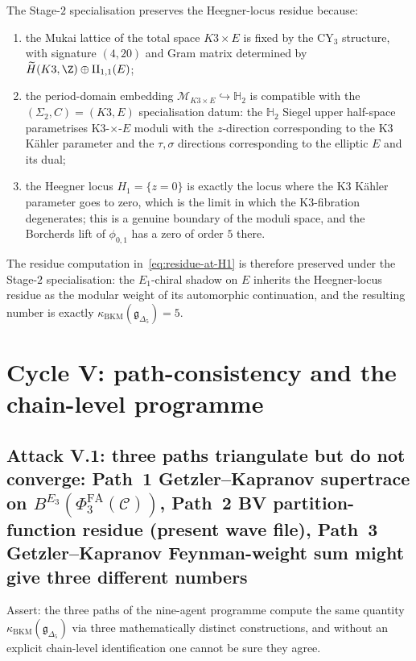 The Stage-$2$ specialisation preserves the Heegner-locus residue
because:
\begin{enumerate}[label=\textup{(\alph*)}]
\item the Mukai lattice of the total space $K3 \times E$ is fixed by
the CY$_3$ structure, with signature $(4, 20)$ and Gram matrix
determined by $\widetilde H(K3, \Z) \oplus \mathrm{II}_{1,1}(E)$;
\item the period-domain embedding $\mathcal{M}_{K3 \times E}
\hookrightarrow \mathbb{H}_2$ is compatible with the $(\Sigma_2, C) =
(K3, E)$ specialisation datum: the $\mathbb{H}_2$ Siegel upper
half-space parametrises K3-$\times$-$E$ moduli with the $z$-direction
corresponding to the K3 Kähler parameter and the $\tau, \sigma$
directions corresponding to the elliptic $E$ and its dual;
\item the Heegner locus $H_1 = \{z=0\}$ is exactly the locus where the
K3 Kähler parameter goes to zero, which is the limit in which the
K3-fibration degenerates; this is a genuine boundary of the moduli
space, and the Borcherds lift of $\phi_{0,1}$ has a zero of order
$5$ there.
\end{enumerate}
The residue computation in~\eqref{eq:residue-at-H1} is therefore
preserved under the Stage-$2$ specialisation: the $E_1$-chiral shadow
on $E$ inherits the Heegner-locus residue as the modular weight of
its automorphic continuation, and the resulting number is exactly
$\kappa_{\mathrm{BKM}}(\mathfrak{g}_{\Delta_5}) = 5$.

\section*{Cycle V: path-consistency and the chain-level programme}
\label{sec:BL-4-cycle-5}

\subsection*{Attack V.1: three paths triangulate but do not converge:
Path~1 Getzler--Kapranov supertrace on
$B^{E_3}(\Phi^{\mathrm{FA}}_3(\mathcal{C}))$, Path~2 BV
partition-function residue (present wave file), Path~3
Getzler--Kapranov Feynman-weight sum might give three different numbers}

Assert: the three paths of the nine-agent programme compute the same
quantity $\kappa_{\mathrm{BKM}}(\mathfrak{g}_{\Delta_5})$ via three
mathematically distinct constructions, and without an explicit
chain-level identification one cannot be sure they agree.

